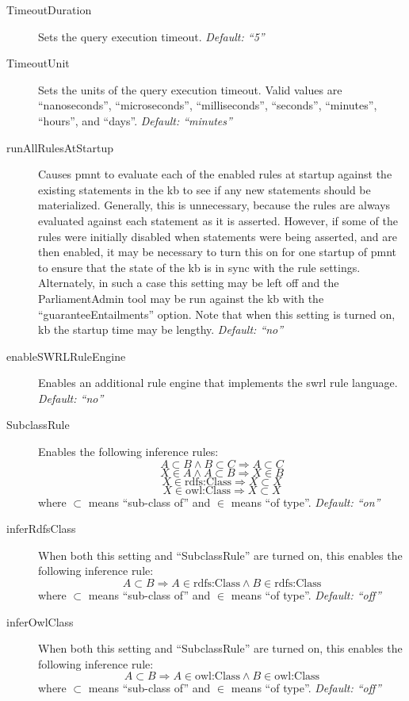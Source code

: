 \begin{description}
	\item[TimeoutDuration] Sets the query execution timeout. \emph{Default: ``5''}

	\item[TimeoutUnit] Sets the units of the query execution timeout.  Valid values are ``nanoseconds'', ``microseconds'', ``milliseconds'', ``seconds'', ``minutes'', ``hours'', and ``days''. \emph{Default: ``minutes''}

	\item[runAllRulesAtStartup] Causes \ac{pmnt} to evaluate each of the enabled rules at startup against the existing statements in the \ac{kb} to see if any new statements should be materialized.  Generally, this is unnecessary, because the rules are always evaluated against each statement as it is asserted.  However, if some of the rules were initially disabled when statements were being asserted, and are then enabled, it may be necessary to turn this on for one startup of \ac{pmnt} to ensure that the state of the \ac{kb} is in sync with the rule settings.  Alternately, in such a case this setting may be left off and the ParliamentAdmin tool may be run against the \ac{kb} with the ``guaranteeEntailments'' option.  Note that when this setting is turned on, \ac{kb} the startup time may be lengthy. \emph{Default: ``no''}

	\item[enableSWRLRuleEngine] Enables an additional rule engine that implements the \ac{swrl} rule language. \emph{Default: ``no''}

	\item[SubclassRule] Enables the following inference rules:
\[A \subset B \land B \subset C \Rightarrow A \subset C\]
\[X \in A \land A \subset B \Rightarrow X \in B\]
\[X \in \text{rdfs:Class} \Rightarrow X \subset X\]
\[X \in \text{owl:Class} \Rightarrow X \subset X\]
where $\subset$ means ``sub-class of'' and $\in$ means ``of type''. \emph{Default: ``on''}

	\item[inferRdfsClass] When both this setting and ``SubclassRule'' are turned on, this enables the following inference rule:
\[A \subset B \Rightarrow A \in \text{rdfs:Class} \land B \in \text{rdfs:Class}\]
where $\subset$ means ``sub-class of'' and $\in$ means ``of type''. \emph{Default: ``off''}

	\item[inferOwlClass] When both this setting and ``SubclassRule'' are turned on, this enables the following inference rule:
\[A \subset B \Rightarrow A \in \text{owl:Class} \land B \in \text{owl:Class}\]
where $\subset$ means ``sub-class of'' and $\in$ means ``of type''. \emph{Default: ``off''}


\end{description}
